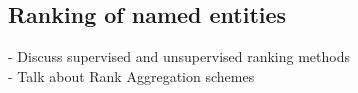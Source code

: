 \subsection{Ranking of named entities}

- Discuss supervised and unsupervised ranking methods \\
- Talk about Rank Aggregation schemes \\

